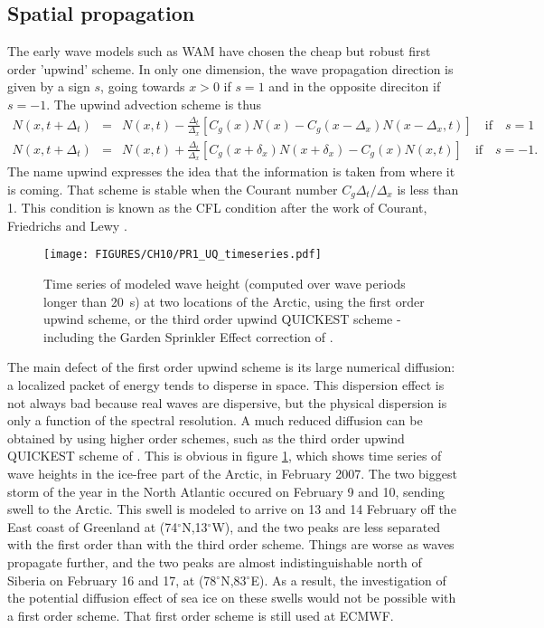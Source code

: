 \subsection{Spatial propagation}
The early wave models such as WAM \citep{WAMDI1988} have chosen the cheap but robust first order 'upwind' scheme. 
In only one dimension, the wave propagation direction is given by a sign $s$, going towards $x>0$ if $s=1$ and in the opposite direciton if $s=-1$. The 
upwind advection scheme is thus 
\begin{eqnarray}
 N(x,t+\Delta_t) & =&  N(x,t) - \frac{\Delta_t}{\Delta_x} \left[ C_g(x) N(x) - C_g(x-\Delta_x) N(x-\Delta_x,t) \right] \quad \mathrm{if} \quad s =1 \\
N(x,t+\Delta_t) & =&  N(x,t) + \frac{\Delta_t}{\Delta_x} \left[ C_g(x+\delta_x) N(x+\delta_x) - C_g(x) N(x,t) \right] \quad \mathrm{if} \quad s=-1. 
\end{eqnarray}
The name upwind expresses the idea that the information is taken from  where it is coming. That scheme is stable when the Courant number 
$C_g \Delta_t/\Delta_x$ is less than 1. This condition is known as the CFL condition after the work of Courant, Friedrichs and Lewy \citep{Courant&al.1928}.
\begin{figure}[htb]
\centerline{\texttt{[image: FIGURES/CH10/PR1\_UQ\_timeseries.pdf]}}
\caption{Time series of modeled wave height (computed over wave periods longer than 20~s) at two locations of the Arctic, using 
the first order upwind scheme, or 
the third order upwind QUICKEST scheme - including the Garden Sprinkler Effect correction of  \cite{Tolman2002a}.}
\label{fig:PR1_UQ_time}
\end{figure}

The main defect of the first order upwind scheme is its large numerical diffusion: a localized packet of energy tends to disperse in space. This 
dispersion effect is not always bad because real waves are dispersive, but the physical dispersion is only a function of the spectral resolution. 
A much reduced diffusion can be obtained by using higher order schemes, such as the third order upwind QUICKEST scheme of \cite{Leonard1991}.
This is obvious in figure \ref{fig:PR1_UQ_time}, which shows time series of wave heights
in the ice-free part of the Arctic, in February 2007. The two biggest storm of the year in the North Atlantic occured on February 9 and 10, 
sending swell to the Arctic. This swell is modeled to arrive on 13 and 14 February off the East coast of Greenland at (74$^\circ$N,13$^\circ$W), 
and the two peaks are less separated with the first order than with the third order scheme. Things are worse as waves propagate further, and the 
two peaks are almost indistinguishable north of Siberia on February 16 and 17, at (78$^\circ$N,83$^\circ$E). As a result, the investigation of the potential diffusion 
effect of sea ice on these swells \citep{Ardhuin&al.2016} would not be possible with a first order scheme. That first order scheme is still used 
at ECMWF. 

